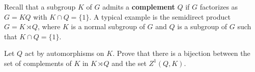 Recall that a subgroup $K$ of $G$ admits a \textbf{complement} $Q$ 
if $G$ factorizes as 
$G=KQ$ with $K\cap Q=\{1\}$. 
A typical example is the semidirect product $G=K\rtimes Q$, where $K$ is a normal subgroup of 
$G$ and $Q$ is a subgroup of $G$ such that $K\cap Q=\{1\}$. 

\begin{exercise}
\label{xca:complementos}
Let $Q$ act by automorphisms on $K$. Prove that there is a bijection 
between the set of complements of $K$ in $K\rtimes Q$ and the set 
$Z^1(Q,K)$.
\end{exercise}

	
	


	
	


